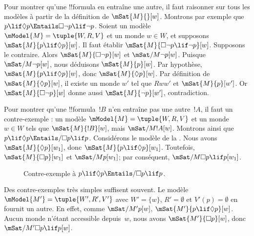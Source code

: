 \documentclass[../../../include/open-logic-section]{subfiles}
\begin{document}
\begin{ex}
  Pour montrer qu'une !!{formula} en entraîne une autre, il faut
  raisonner sur tous les modèles à partir de la définition de
  $\mSat{M}{}[w]$. Montrons par exemple que
  $p \lif \Diamond p \Entails \Box\lnot p \lif \lnot p$.
  Soient un modèle $\mModel{M} = \tuple{W, R,
    V}$ et un monde $w \in W$, et supposons
  $\mSat{M}{p \lif \Diamond p}[w]$. Il faut établir
  $\mSat{M}{\Box\lnot p \lif \lnot p}[w]$. Supposons le contraire.
  Alors $\mSat{M}{\Box\lnot p}[w]$ et
  $\mSat/{M}{\lnot p}[w]$. Puisque
  $\mSat/{M}{\lnot p}[w]$, nous déduisons
  $\mSat{M}{p}[w]$. Par hypothèse,
  $\mSat{M}{p \lif \Diamond p}[w]$, donc
  $\mSat{M}{\Diamond p}[w]$. Par définition de
  $\mSat{M}{\Diamond p}[w]$, il existe un monde $w'$ tel que
  $Rww'$ et $\mSat{M}{p}[w']$. Or
  $\mSat{M}{\Box \lnot p}[w]$ donne aussi
  $\mSat{M}{\lnot p}[w']$, contradiction.

  Pour montrer qu'une !!{formula}~$!B$ n'en entraîne pas une
  autre~$!A$, il faut un contre-exemple : un modèle
  $\mModel{M} = \tuple{W, R, V}$ et un monde~$w \in W$ tels que
  $\mSat{M}{!B}[w]$, mais $\mSat/{M}{!A}[w]$.
  Montrons ainsi que $p \lif \Diamond p \Entails/
  \Box p \lif p$. Considérons le modèle de la
  . Nous avons
  $\mSat{M}{\Diamond p}[w_1]$, donc
  $\mSat{M}{p \lif \Diamond p}[w_1]$. Toutefois,
  $\mSat{M}{\Box p}[w_1]$ et $\mSat/{M}{p}[w_1]$;
  par conséquent, $\mSat/{M}{\Box p \lif p}[w_1]$.
  \begin{figure}
  \begin{center}
  \end{center}
  \caption{Contre-exemple à $p \lif \Diamond p
  \Entails/ \Box p \lif p$.}
  \end{figure}
  
  Des contre-exemples très simples suffisent souvent. Le modèle
  $\mModel{M'} = \tuple{W', R', V'}$ avec $W' = \{w\}$,
  $R' = \emptyset$ et $V'(p) = \emptyset$ en fournit un autre.
  En effet, comme $\mSat/{M'}{p}[w]$,
  $\mSat{M'}{p \lif \Diamond p}[w]$. Aucun monde n'étant
  accessible depuis~$w$, nous avons $\mSat{M'}{\Box p}[w]$,
  donc $\mSat/{M'}{\Box p \lif p}[w]$.
\end{ex}
\end{document}
